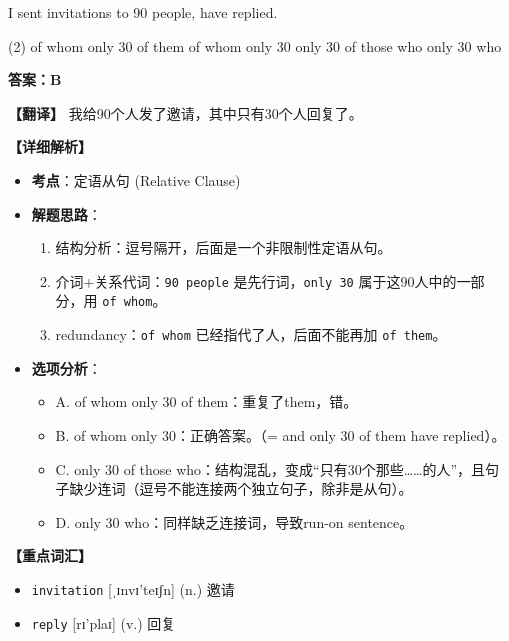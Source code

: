\documentclass[11pt, a4paper]{article}
\newcommand{\analysis}[4]{
    \begin{solutionbox}
        \textbf{答案：#1}
        
        \textbf{【翻译】} #2
        
        \textbf{【详细解析】}
        #3
        
        \textbf{【重点词汇】}
        #4
    \end{solutionbox}
}
\newcommand{\blank}{\underline{\hspace{1.5cm}}}
\begin{document}
\begin{questions}
    \item I sent invitations to 90 people, \blank have replied.
    \begin{tasks}(2)
        \task of whom only 30 of them \task of whom only 30
        \task only 30 of those who \task only 30 who
    \end{tasks}
    \analysis{B}{我给90个人发了邀请，其中只有30个人回复了。}{
        \begin{itemize}
            \item \textbf{考点}：定语从句 (Relative Clause)
            \item \textbf{解题思路}：
                \begin{enumerate}
                    \item 结构分析：逗号隔开，后面是一个非限制性定语从句。
                    \item 介词+关系代词：\texttt{90 people} 是先行词，\texttt{only 30} 属于这90人中的一部分，用 \texttt{of whom}。
                    \item  redundancy：\texttt{of whom} 已经指代了人，后面不能再加 \texttt{of them}。
                \end{enumerate}
            \item \textbf{选项分析}：
                \begin{itemize}
                    \item A. of whom only 30 of them：重复了them，错。
                    \item B. of whom only 30：正确答案。（= and only 30 of them have replied）。
                    \item C. only 30 of those who：结构混乱，变成“只有30个那些……的人”，且句子缺少连词（逗号不能连接两个独立句子，除非是从句）。
                    \item D. only 30 who：同样缺乏连接词，导致run-on sentence。
                \end{itemize}
        \end{itemize}
    }{
        \begin{itemize}
            \item \texttt{invitation} [ˌɪnvɪ'teɪʃn] (n.) 邀请
            \item \texttt{reply} [rɪ'plaɪ] (v.) 回复
        \end{itemize}
    }


\end{questions}
\end{document}
